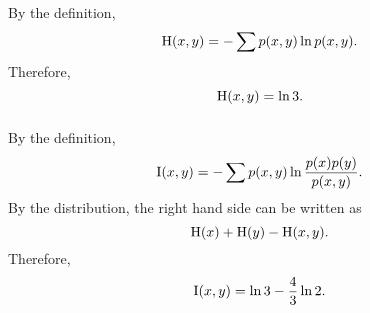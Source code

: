 \subsubsection{}
By the definition,
%
\begin{equation}
{\rm H}(x, y) = - \sum p(x, y) \ln p(x, y).
\end{equation}
%
Therefore,
%
\begin{equation}
{\rm H}(x, y) = \ln 3.
\end{equation}
%


\subsubsection{}
By the definition,
%
\begin{equation}
{\rm I}(x, y) = - \sum p(x, y) \ln \frac{p(x) p(y)}{p(x, y)}.
\end{equation}
%
By the distribution, the right hand side can be written as
%
\begin{equation}
{\rm H}(x) + {\rm H}(y) - {\rm H}(x, y).
\end{equation}
%
Therefore,
%
\begin{equation}
{\rm I}(x, y) = \ln 3- \frac{4}{3} \ln 2.
\end{equation}
%




















